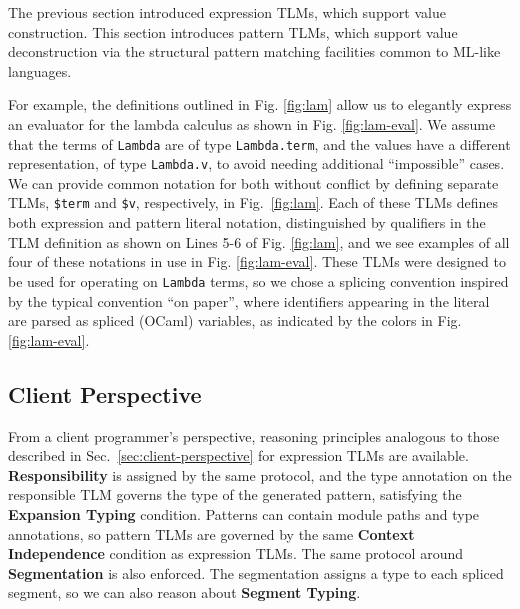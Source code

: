 \documentclass[acmsmall]{acmart}
\newcommand{\li}[1]{\lstinline[basicstyle=\ttfamily\fontsize{9pt}{1em}\selectfont]{#1}}
\begin{document}
The previous section introduced expression TLMs, which support value construction. This section introduces pattern TLMs, which support value deconstruction via the structural pattern matching facilities common to ML-like languages. 

For example, the definitions outlined in Fig. \ref{fig:lam} allow us to elegantly express an evaluator for the lambda calculus as shown in Fig. \ref{fig:lam-eval}. We assume that the terms of \li{Lambda} are of type \li{Lambda.term}, and the values have a different representation, of type \li{Lambda.v}, to avoid needing additional ``impossible'' cases. We can provide common notation for both without conflict by defining separate TLMs, \li{$term} and \li{$v}, respectively, in Fig.~\ref{fig:lam}. Each of these TLMs defines both expression and pattern literal notation, distinguished by qualifiers in the TLM definition as shown on Lines 5-6 of Fig. \ref{fig:lam}, and we see examples of all four of these notations in use in Fig. \ref{fig:lam-eval}. These TLMs were designed to be used for operating on \li{Lambda} terms, so we chose a splicing convention inspired by the typical convention ``on paper'', where identifiers appearing in the literal are parsed as spliced (OCaml) variables, as indicated by the colors in Fig. \ref{fig:lam-eval}. %

\subsection{Client Perspective} From a client programmer's perspective, reasoning principles analogous to those described in Sec.~\ref{sec:client-perspective} for expression TLMs are available. \textbf{Responsibility} is assigned by the same protocol, and the type annotation on the responsible TLM governs the type of the generated pattern, satisfying the \textbf{Expansion Typing} condition. Patterns can contain module paths and type annotations, so pattern TLMs are governed by the same \textbf{Context Independence} condition as expression TLMs. The same protocol around \textbf{Segmentation} is also enforced. The segmentation assigns a type to each spliced segment, so we can also reason about \textbf{Segment Typing}.
\end{document}
